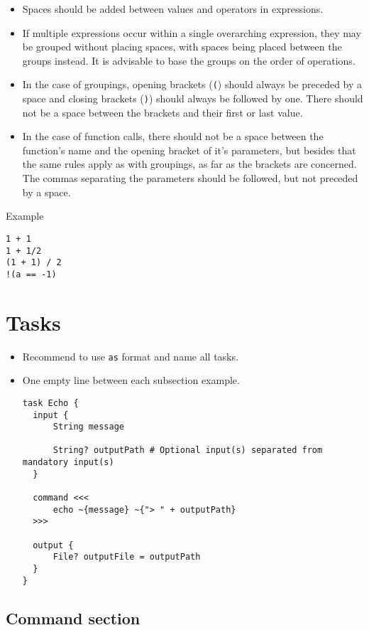 \documentclass[
]{book}
\providecommand{\tightlist}{%
  \setlength{\itemsep}{0pt}\setlength{\parskip}{0pt}}
\begin{document}
\begin{itemize}
\tightlist
\item
  Spaces should be added between values and operators in expressions.
\item
  If multiple expressions occur within a single overarching expression, they may
  be grouped without placing spaces, with spaces being placed between the groups
  instead. It is advisable to base the groups on the order of operations.
\item
  In the case of groupings, opening brackets (\texttt{(}) should always be preceded by
  a space and closing brackets (\texttt{)}) should always be followed by one. There
  should not be a space between the brackets and their first or last value.
\item
  In the case of function calls, there should not be a space between the
  function's name and the opening bracket of it's parameters, but besides that
  the same rules apply as with groupings, as far as the brackets are concerned.
  The commas separating the parameters should be followed, but not preceded by a
  space.
\end{itemize}

Example

\begin{verbatim}
1 + 1
1 + 1/2
(1 + 1) / 2
!(a == -1)
\end{verbatim}

\hypertarget{tasks}{%
\section{Tasks}\label{tasks}}

\begin{itemize}
\item
  Recommend to use \texttt{as} format and name all tasks.
\item
  One empty line between each subsection example.

\begin{verbatim}
task Echo {
  input {
      String message

      String? outputPath # Optional input(s) separated from mandatory input(s)
  }

  command <<<
      echo ~{message} ~{"> " + outputPath}
  >>>

  output {
      File? outputFile = outputPath
  }
}
\end{verbatim}
\end{itemize}

\hypertarget{command-section}{%
\subsection{Command section}\label{command-section}}
\end{document}
